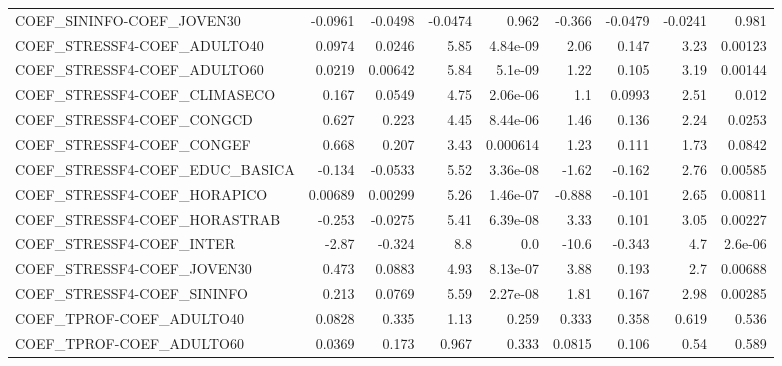 \begin{tabular}{lrrrrrrrr}
COEF\_SININFO-COEF\_JOVEN30             &     -0.0961 &      -0.0498 & -0.0474 &    0.962 &     -0.366 &     -0.0479 &      -0.0241 &         0.981 \\
COEF\_STRESSF4-COEF\_ADULTO40           &      0.0974 &       0.0246 &    5.85 & 4.84e-09 &       2.06 &       0.147 &         3.23 &       0.00123 \\
COEF\_STRESSF4-COEF\_ADULTO60           &      0.0219 &      0.00642 &    5.84 &  5.1e-09 &       1.22 &       0.105 &         3.19 &       0.00144 \\
COEF\_STRESSF4-COEF\_CLIMASECO          &       0.167 &       0.0549 &    4.75 & 2.06e-06 &        1.1 &      0.0993 &         2.51 &         0.012 \\
COEF\_STRESSF4-COEF\_CONGCD             &       0.627 &        0.223 &    4.45 & 8.44e-06 &       1.46 &       0.136 &         2.24 &        0.0253 \\
COEF\_STRESSF4-COEF\_CONGEF             &       0.668 &        0.207 &    3.43 & 0.000614 &       1.23 &       0.111 &         1.73 &        0.0842 \\
COEF\_STRESSF4-COEF\_EDUC\_BASICA        &      -0.134 &      -0.0533 &    5.52 & 3.36e-08 &      -1.62 &      -0.162 &         2.76 &       0.00585 \\
COEF\_STRESSF4-COEF\_HORAPICO           &     0.00689 &      0.00299 &    5.26 & 1.46e-07 &     -0.888 &      -0.101 &         2.65 &       0.00811 \\
COEF\_STRESSF4-COEF\_HORASTRAB          &      -0.253 &      -0.0275 &    5.41 & 6.39e-08 &       3.33 &       0.101 &         3.05 &       0.00227 \\
COEF\_STRESSF4-COEF\_INTER              &       -2.87 &       -0.324 &     8.8 &      0.0 &      -10.6 &      -0.343 &          4.7 &       2.6e-06 \\
COEF\_STRESSF4-COEF\_JOVEN30            &       0.473 &       0.0883 &    4.93 & 8.13e-07 &       3.88 &       0.193 &          2.7 &       0.00688 \\
COEF\_STRESSF4-COEF\_SININFO            &       0.213 &       0.0769 &    5.59 & 2.27e-08 &       1.81 &       0.167 &         2.98 &       0.00285 \\
COEF\_TPROF-COEF\_ADULTO40              &      0.0828 &        0.335 &    1.13 &    0.259 &      0.333 &       0.358 &        0.619 &         0.536 \\
COEF\_TPROF-COEF\_ADULTO60              &      0.0369 &        0.173 &   0.967 &    0.333 &     0.0815 &       0.106 &         0.54 &         0.589 \\

\end{tabular}
